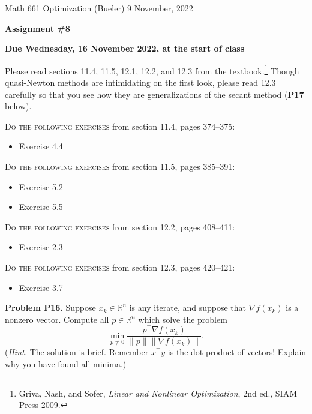 \documentclass[12pt]{amsart}
\newcommand{\RR}{\mathbb{R}}
\newcommand{\grad}{\nabla}
\newcommand{\prob}[1]{\bigskip\noindent\textbf{#1}\quad }
\begin{document}
\scriptsize \noindent Math 661 Optimization (Bueler) \hfill 9 November, 2022
\normalsize

\medskip\bigskip

\Large\centerline{\textbf{Assignment \#8}}
\large
\bigskip

\centerline{\textbf{Due Wednesday, 16 November 2022, at the start of class}}
\bigskip
\normalsize

\thispagestyle{empty}

\bigskip
Please read sections 11.4, 11.5, 12.1, 12.2, and 12.3 from the textbook.\footnote{Griva, Nash, and Sofer, \emph{Linear and Nonlinear Optimization}, 2nd ed., SIAM Press 2009.}  Though quasi-Newton methods are intimidating on the first look, please read 12.3 carefully so that you see how they are generalizations of the secant method (\textbf{P17} below).

\bigskip
\noindent \textsc{Do the following exercises} from section 11.4, pages 374--375:

\begin{itemize}
\item Exercise 4.4
\end{itemize}

\bigskip
\noindent \textsc{Do the following exercises} from section 11.5, pages 385--391:

\begin{itemize}
\item Exercise 5.2
\item Exercise 5.5
\end{itemize}


\bigskip
\noindent \textsc{Do the following exercises} from section 12.2, pages 408--411:

\begin{itemize}
\item Exercise 2.3
\end{itemize}


\bigskip
\noindent \textsc{Do the following exercises} from section 12.3, pages 420--421:

\begin{itemize}
\item Exercise 3.7
\end{itemize}


\medskip
\prob{Problem P16.}  Suppose $x_k \in \RR^n$ is any iterate, and suppose that $\grad f(x_k)$ is a nonzero vector.  Compute all $p \in \RR^n$ which solve the problem
    $$\min_{p\ne 0} \frac{p^\top \grad f(x_k)}{\|p\| \|\grad f(x_k)\|}.$$
(\emph{Hint.}  The solution is brief.  Remember $x^\top y$ is the dot product of vectors!  Explain why you have found all minima.)
\end{document}
